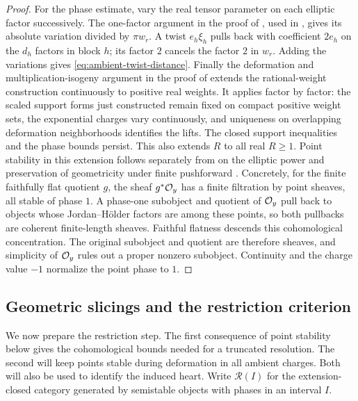 \begin{proof}
For the phase estimate, vary the real tensor parameter on each elliptic
factor successively.  The one-factor argument in the proof of
\cite[Theorem~2.4]{ChengFeyzbakhsh2026}, used in
\cite[Remark~4.4]{Cheng2026}, gives its absolute variation divided by
$\pi w_r$.  A twist $e_h\xi_h$ pulls back with coefficient $2e_h$ on the
$d_h$ factors in block $h$; its factor $2$ cancels the factor $2$ in $w_r$.
Adding the variations gives \eqref{eq:ambient-twist-distance}.
Finally the deformation and multiplication-isogeny argument in the proof of
\cite[Proposition~4.3]{Cheng2026} extends the rational-weight construction
continuously to positive real weights.  It applies factor by factor: the
scaled support forms just constructed remain fixed on compact positive
weight sets, the exponential charges vary continuously, and uniqueness on
overlapping deformation neighborhoods identifies the lifts.  The closed
support inequalities and the phase bounds persist.  This also extends $R$
to all real $R\ge1$.  Point stability in this extension follows separately
from \cite[Theorem~4.1(1)]{LiEtAl2026} on the elliptic power and preservation
of geometricity under finite pushforward
\cite[Remark~3.11]{LiEtAl2026}.  Concretely, for the finite faithfully flat
quotient $g$, the sheaf $g^*\mathcal O_y$ has a finite filtration by point sheaves,
all stable of phase $1$.  A phase-one subobject and quotient of $\mathcal O_y$
pull back to objects whose Jordan--H\"older factors are among these points,
so both pullbacks are coherent finite-length sheaves.  Faithful flatness
descends this cohomological concentration.  The original subobject and
quotient are therefore sheaves, and simplicity of $\mathcal O_y$ rules out a
proper nonzero subobject.  Continuity and the charge value $-1$ normalize
the point phase to $1$.
\end{proof}

\subsection{Geometric slicings and the restriction criterion}

We now prepare the restriction step.  The first consequence of point
stability below gives the cohomological bounds needed for a truncated
resolution.  The second will keep points stable during deformation in
all ambient charges.  Both will also be used to identify the induced
heart.  Write
$\mathcal R(I)$ for the extension-closed category generated by semistable
objects with phases in an interval $I$.

